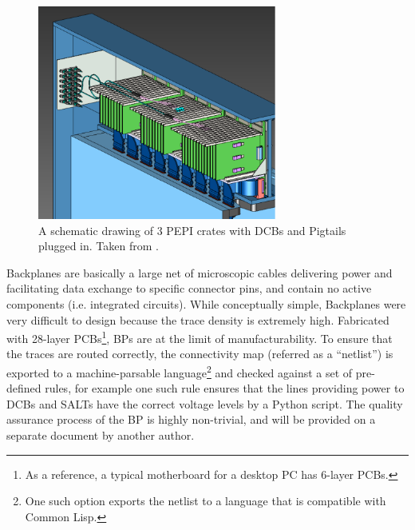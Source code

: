 \begin{figure}[!htb]
    \centering
    \includegraphics[width=0.7\textwidth]{./figs-ut-upgrade/detector/pepi_crates.pdf}
    \caption{
        A schematic drawing of 3 PEPI crates with DCBs and Pigtails plugged in.
        Taken from \cite{Andrews:2018vla}.
    }
    \label{fig:pepi-crate}
\end{figure}

Backplanes are basically a large net of microscopic cables delivering power
and facilitating data exchange to specific connector pins, and contain no active
components (i.e. integrated circuits).
While conceptually simple, Backplanes were very difficult to design because the
trace density is extremely high.
Fabricated with 28-layer PCBs\footnote{
    As a reference, a typical motherboard for a desktop PC has 6-layer PCBs.
}, BPs are at the limit of manufacturability.
To ensure that the traces are routed correctly,
the connectivity map (referred as a ``netlist'') is exported to a
machine-parsable language\footnote{
    One such option exports the netlist to a language that is compatible with
    Common Lisp.
} and checked against a set of pre-defined rules,
for example one such rule ensures that the lines providing power to DCBs
and SALTs have the correct voltage levels
by a Python script.
The quality assurance process of the BP is highly non-trivial, and will
be provided on a separate document by another author.

